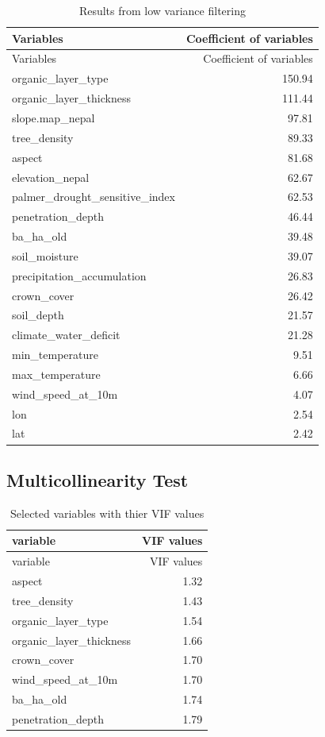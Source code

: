 \documentclass[
]{article}
\begin{document}
\begin{longtable}[]{@{}lr@{}}
\caption{Results from low variance filtering}\tabularnewline
\toprule\noalign{}
Variables & Coefficient of variables \\
\midrule\noalign{}
\endfirsthead
\toprule\noalign{}
Variables & Coefficient of variables \\
\midrule\noalign{}
\endhead
\bottomrule\noalign{}
\endlastfoot
organic\_layer\_type & 150.94 \\
organic\_layer\_thickness & 111.44 \\
slope.map\_nepal & 97.81 \\
tree\_density & 89.33 \\
aspect & 81.68 \\
elevation\_nepal & 62.67 \\
palmer\_drought\_sensitive\_index & 62.53 \\
penetration\_depth & 46.44 \\
ba\_ha\_old & 39.48 \\
soil\_moisture & 39.07 \\
precipitation\_accumulation & 26.83 \\
crown\_cover & 26.42 \\
soil\_depth & 21.57 \\
climate\_water\_deficit & 21.28 \\
min\_temperature & 9.51 \\
max\_temperature & 6.66 \\
wind\_speed\_at\_10m & 4.07 \\
lon & 2.54 \\
lat & 2.42 \\
\end{longtable}

\hypertarget{multicollinearity-test}{%
\subsection{Multicollinearity Test}\label{multicollinearity-test}}

\begin{longtable}[]{@{}lr@{}}
\caption{Selected variables with thier VIF values}\tabularnewline
\toprule\noalign{}
variable & VIF values \\
\midrule\noalign{}
\endfirsthead
\toprule\noalign{}
variable & VIF values \\
\midrule\noalign{}
\endhead
\bottomrule\noalign{}
\endlastfoot
aspect & 1.32 \\
tree\_density & 1.43 \\
organic\_layer\_type & 1.54 \\
organic\_layer\_thickness & 1.66 \\
crown\_cover & 1.70 \\
wind\_speed\_at\_10m & 1.70 \\
ba\_ha\_old & 1.74 \\
penetration\_depth & 1.79 \\
\end{longtable}
\end{document}
